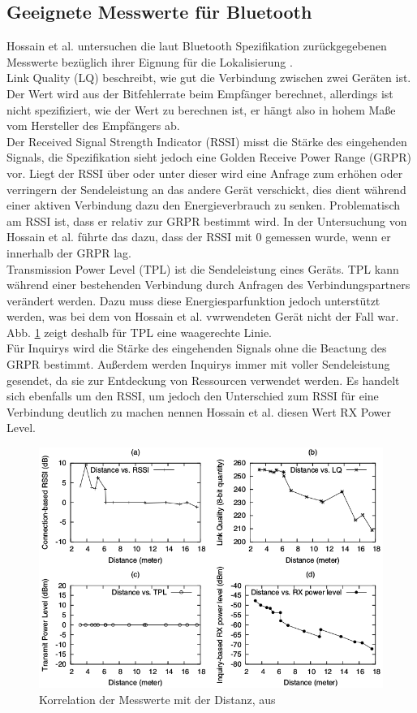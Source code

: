 \subsection{Geeignete Messwerte für Bluetooth}
Hossain et al. untersuchen die laut Bluetooth Spezifikation zurückgegebenen Messwerte bezüglich ihrer Eignung für die Lokalisierung \cite{hossain2007comprehensive}.\\ 
Link Quality (LQ) beschreibt, wie gut die Verbindung zwischen zwei Geräten ist.
Der Wert wird aus der Bitfehlerrate beim Empfänger berechnet, allerdings ist nicht spezifiziert, wie der Wert zu berechnen ist, er hängt also in hohem Maße vom Hersteller des Empfängers ab. \\
Der Received Signal Strength Indicator (RSSI) misst die Stärke des eingehenden Signals, die Spezifikation sieht jedoch eine Golden Receive Power Range (GRPR) vor. 
Liegt der RSSI über oder unter dieser wird eine Anfrage zum erhöhen oder verringern der Sendeleistung an das andere Gerät verschickt, dies dient während einer aktiven Verbindung dazu den Energieverbrauch zu senken.
Problematisch am RSSI ist, dass er relativ zur GRPR bestimmt wird.
In der Untersuchung von Hossain et al. führte das dazu, dass der RSSI mit 0 gemessen wurde, wenn er innerhalb der GRPR lag. \\
Transmission Power Level (TPL) ist die Sendeleistung eines Geräts. 
TPL kann während einer bestehenden Verbindung durch Anfragen des Verbindungspartners verändert werden.
Dazu muss diese Energiesparfunktion jedoch unterstützt werden, was bei dem von Hossain et al. vwrwendeten Gerät nicht der Fall war.
Abb. \ref{fig:bluetoothmess} zeigt deshalb für TPL eine waagerechte Linie.\\
Für Inquirys wird die Stärke des eingehenden Signals ohne die Beactung des GRPR bestimmt.
Außerdem werden Inquirys immer mit voller Sendeleistung gesendet, da sie zur Entdeckung von Ressourcen verwendet werden.
Es handelt sich ebenfalls um den RSSI, um jedoch den Unterschied zum RSSI für eine Verbindung deutlich zu machen nennen Hossain et al. diesen Wert RX Power Level.

\begin{figure}[h]
  \centering
	\includegraphics[width=\textwidth]{images/bluetoothmess.png}
  \caption{Korrelation der Messwerte mit der Distanz, aus \cite{hossain2007comprehensive}}
  \label{fig:bluetoothmess}
\end{figure}

